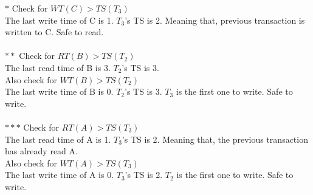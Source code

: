 \documentclass{article}
\begin{document}
\begin{enumerate}
\begin{enumerate}
\begin{center}
\begin{longtable}{|p{2cm}|p{1.5cm}|p{1.5cm}|p{1.5cm}|p{1.5cm}|p{1.5cm}|p{1.5cm}|}
                 & & & & & & \\
                \hline 
            \end{longtable}
        \end{center}
        $*$ Check for $WT(C) > TS(T_3)$\\
        The last write time of C is 1. $T_3$'s TS is 2. Meaning that, previous transaction is written to C. Safe to read. \\
        \\
        $**$ Check for $RT(B) > TS(T_2)$ \\
        The last read time of B is 3. $T_2$'s TS is 3.\\
        Also check for $WT(B) > TS(T_2)$ \\
        The last write time of B is 0. $T_2$'s TS is 3. $T_3$ is the first one to write. Safe to write.\\
        \\
        $***$ Check for $RT(A) > TS(T_3)$\\
        The last read time of A is 1. $T_3$'s TS is 2. Meaning that, the previous transaction has already read A. \\
        Also check for $WT(A) > TS(T_3)$ \\
        The last write time of A is 0. $T_3$'s TS is 2. $T_2$ is the first one to write. Safe to write.\\
    
    \end{enumerate}
    
\end{enumerate}
\end{document}
